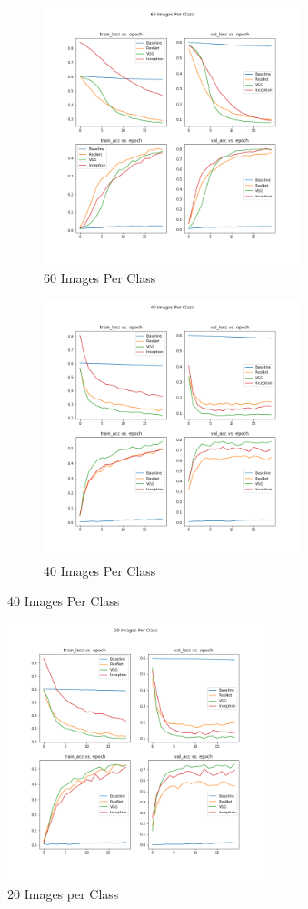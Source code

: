 \documentclass{article}
\begin{document}
\begin{figure}[h!]
    \centering
    \begin{subfigure}{.5\textwidth}
    \centering
    \includegraphics[height=7.5cm]{60 Images Per Class.png}
    \caption{60 Images Per Class}
    \label{fig:60}
    \end{subfigure}%
    \begin{subfigure}{.5\textwidth}
    \centering
    \includegraphics[height=7.5cm]{40 Images Per Class.png}
    \caption{40 Images Per Class}
    \label{fig:40}
    \end{subfigure}
\end{figure}

\begin{figure}[h!]
    \centering
    \includegraphics[height=7.5cm]{20 Images Per Class.png}
    \caption{20 Images per Class}
    \label{fig:20}
\end{figure}
\end{document}
